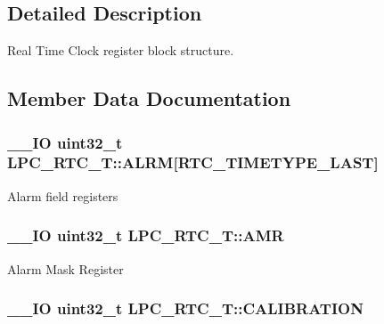 \subsection{Detailed Description}
Real Time Clock register block structure. 

\subsection{Member Data Documentation}
\hypertarget{struct_l_p_c___r_t_c___t_abeb0bd5d52ee9f40f515b9b007c7a832}{
\subsubsection[{A\+L\+R\+M}]{\setlength{\rightskip}{0pt plus 5cm}\+\_\+\+\_\+\+I\+O uint32\+\_\+t L\+P\+C\+\_\+\+R\+T\+C\+\_\+\+T\+::\+A\+L\+R\+M\mbox{[}R\+T\+C\+\_\+\+T\+I\+M\+E\+T\+Y\+P\+E\+\_\+\+L\+A\+S\+T\mbox{]}}}\label{struct_l_p_c___r_t_c___t_abeb0bd5d52ee9f40f515b9b007c7a832}
Alarm field registers \hypertarget{struct_l_p_c___r_t_c___t_af8b21ae5aa8bedcb0a1dd918678ee389}{
\subsubsection[{A\+M\+R}]{\setlength{\rightskip}{0pt plus 5cm}\+\_\+\+\_\+\+I\+O uint32\+\_\+t L\+P\+C\+\_\+\+R\+T\+C\+\_\+\+T\+::\+A\+M\+R}}\label{struct_l_p_c___r_t_c___t_af8b21ae5aa8bedcb0a1dd918678ee389}
Alarm Mask Register \hypertarget{struct_l_p_c___r_t_c___t_ade5b98ca9e6ea8af2fd91e8a4f20503b}{
\subsubsection[{C\+A\+L\+I\+B\+R\+A\+T\+I\+O\+N}]{\setlength{\rightskip}{0pt plus 5cm}\+\_\+\+\_\+\+I\+O uint32\+\_\+t L\+P\+C\+\_\+\+R\+T\+C\+\_\+\+T\+::\+C\+A\+L\+I\+B\+R\+A\+T\+I\+O\+N}}\label{struct_l_p_c___r_t_c___t_ade5b98ca9e6ea8af2fd91e8a4f20503b}
